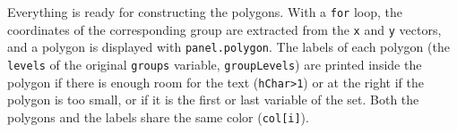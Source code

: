 \documentclass[smallroyalvopaper]{memoir}
\begin{document}
Everything is ready for constructing the polygons. With a \texttt{for} loop,
the coordinates of the corresponding group are extracted from the \texttt{x}
and \texttt{y} vectors, and a polygon is displayed with \texttt{panel.polygon}. The
labels of each polygon (the \texttt{levels} of the original \texttt{groups}
variable, \texttt{groupLevels}) are printed inside the polygon if there is
enough room for the text (\texttt{hChar>1}) or at the right if the polygon is
too small, or if it is the first or last variable of the set. Both the
polygons and the labels share the same color (\texttt{col[i]}).

\end{document}
